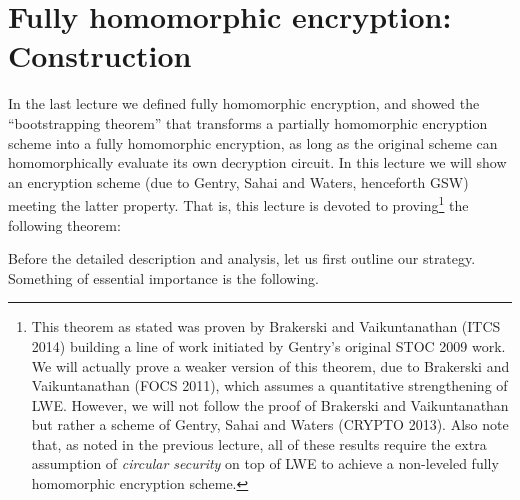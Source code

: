 \chapter{Fully homomorphic encryption: Construction}\label{chapfhetwo}

In the last lecture we defined fully homomorphic encryption, and showed
the ``bootstrapping theorem'' that transforms a partially homomorphic
encryption scheme into a fully homomorphic encryption, as long as the
original scheme can homomorphically evaluate its own decryption circuit.
In this lecture we will show an encryption scheme (due to Gentry, Sahai
and Waters, henceforth GSW) meeting the latter property. That is, this
lecture is devoted to proving\footnote{This theorem as stated was proven
  by Brakerski and Vaikuntanathan (ITCS 2014) building a line of work
  initiated by Gentry's original STOC 2009 work. We will actually prove
  a weaker version of this theorem, due to Brakerski and Vaikuntanathan
  (FOCS 2011), which assumes a quantitative strengthening of LWE.
  However, we will not follow the proof of Brakerski and Vaikuntanathan
  but rather a scheme of Gentry, Sahai and Waters (CRYPTO 2013). Also
  note that, as noted in the previous lecture, all of these results
  require the extra assumption of \emph{circular security} on top of LWE
  to achieve a non-leveled fully homomorphic encryption scheme.} the
following theorem:

\hypertarget{LWEFHEthm}{}

Before the detailed description and analysis, let us first outline our
strategy. Something of essential importance is the following.


